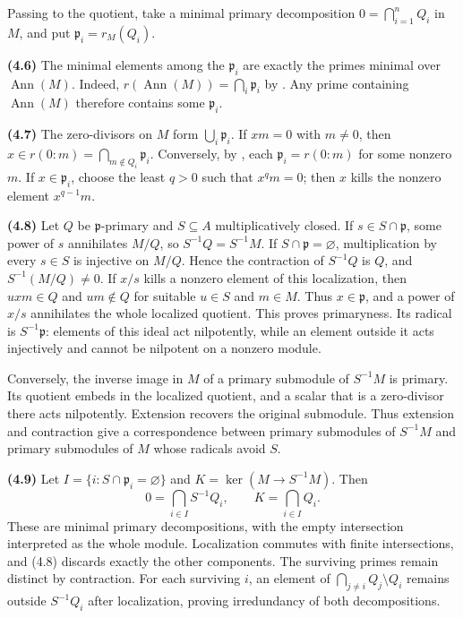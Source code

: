 Passing to the quotient, take a minimal primary decomposition $0=\bigcap_{i=1}^nQ_i$ in $M$, and put $\mathfrak{p}_i=r_M(Q_i)$.

\textbf{(4.6)} The minimal elements among the $\mathfrak{p}_i$ are exactly the primes minimal over $\operatorname{Ann}(M)$. Indeed, $r(\operatorname{Ann}(M))=\bigcap_i\mathfrak{p}_i$ by . Any prime containing $\operatorname{Ann}(M)$ therefore contains some $\mathfrak{p}_i$.

\textbf{(4.7)} The zero-divisors on $M$ form $\bigcup_i\mathfrak{p}_i$. If $xm=0$ with $m\ne0$, then $x\in r(0:m)=\bigcap_{m\notin Q_i}\mathfrak{p}_i$. Conversely, by , each $\mathfrak{p}_i=r(0:m)$ for some nonzero $m$. If $x\in\mathfrak{p}_i$, choose the least $q>0$ such that $x^qm=0$; then $x$ kills the nonzero element $x^{q-1}m$.

\textbf{(4.8)} Let $Q$ be $\mathfrak{p}$-primary and $S\subseteq A$ multiplicatively closed. If $s\in S\cap\mathfrak{p}$, some power of $s$ annihilates $M/Q$, so $S^{-1}Q=S^{-1}M$. If $S\cap\mathfrak{p}=\varnothing$, multiplication by every $s\in S$ is injective on $M/Q$. Hence the contraction of $S^{-1}Q$ is $Q$, and $S^{-1}(M/Q)\ne0$. If $x/s$ kills a nonzero element of this localization, then $uxm\in Q$ and $um\notin Q$ for suitable $u\in S$ and $m\in M$. Thus $x\in\mathfrak{p}$, and a power of $x/s$ annihilates the whole localized quotient. This proves primaryness. Its radical is $S^{-1}\mathfrak{p}$: elements of this ideal act nilpotently, while an element outside it acts injectively and cannot be nilpotent on a nonzero module.

Conversely, the inverse image in $M$ of a primary submodule of $S^{-1}M$ is primary. Its quotient embeds in the localized quotient, and a scalar that is a zero-divisor there acts nilpotently. Extension recovers the original submodule. Thus extension and contraction give a correspondence between primary submodules of $S^{-1}M$ and primary submodules of $M$ whose radicals avoid $S$.

\textbf{(4.9)} Let $I=\{i:S\cap\mathfrak{p}_i=\varnothing\}$ and $K=\ker(M\to S^{-1}M)$. Then
\[0=\bigcap_{i\in I}S^{-1}Q_i,\qquad K=\bigcap_{i\in I}Q_i.\]
These are minimal primary decompositions, with the empty intersection interpreted as the whole module. Localization commutes with finite intersections, and (4.8) discards exactly the other components. The surviving primes remain distinct by contraction. For each surviving $i$, an element of $\bigcap_{j\ne i}Q_j\setminus Q_i$ remains outside $S^{-1}Q_i$ after localization, proving irredundancy of both decompositions.

